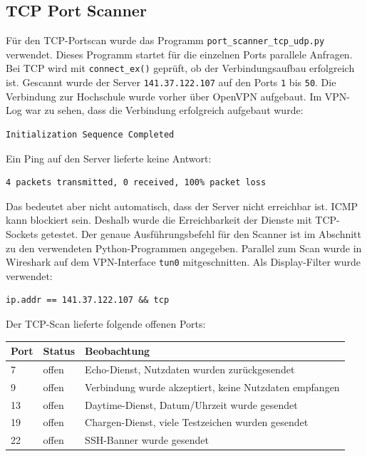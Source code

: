 \documentclass{kdiartcl}
\begin{document}
\subsection{TCP Port Scanner}

Für den TCP-Portscan wurde das Programm \texttt{port\_scanner\_tcp\_udp.py} verwendet. Dieses Programm startet für die einzelnen Ports parallele Anfragen. Bei TCP wird mit \texttt{connect\_ex()} geprüft, ob der Verbindungsaufbau erfolgreich ist. Gescannt wurde der Server \texttt{141.37.122.107} auf den Ports \texttt{1} bis \texttt{50}. Die Verbindung zur Hochschule wurde vorher über OpenVPN aufgebaut. Im VPN-Log war zu sehen, dass die Verbindung erfolgreich aufgebaut wurde:

\begin{verbatim}
Initialization Sequence Completed
\end{verbatim}

Ein Ping auf den Server lieferte keine Antwort:

\begin{verbatim}
4 packets transmitted, 0 received, 100% packet loss
\end{verbatim}

Das bedeutet aber nicht automatisch, dass der Server nicht erreichbar ist. ICMP kann blockiert sein. Deshalb wurde die Erreichbarkeit der Dienste mit TCP-Sockets getestet. Der genaue Ausführungsbefehl für den Scanner ist im Abschnitt zu den verwendeten Python-Programmen angegeben. Parallel zum Scan wurde in Wireshark auf dem VPN-Interface \texttt{tun0} mitgeschnitten. Als Display-Filter wurde verwendet:

\begin{verbatim}
ip.addr == 141.37.122.107 && tcp
\end{verbatim}

Der TCP-Scan lieferte folgende offenen Ports:

\begin{center}
\begin{tabular}{|l|l|l|}
\hline
Port & Status & Beobachtung \\
\hline
7 & offen & Echo-Dienst, Nutzdaten wurden zurückgesendet \\
9 & offen & Verbindung wurde akzeptiert, keine Nutzdaten empfangen \\
13 & offen & Daytime-Dienst, Datum/Uhrzeit wurde gesendet \\
19 & offen & Chargen-Dienst, viele Testzeichen wurden gesendet \\
22 & offen & SSH-Banner wurde gesendet \\
\hline
\end{tabular}
\end{center}
\end{document}
